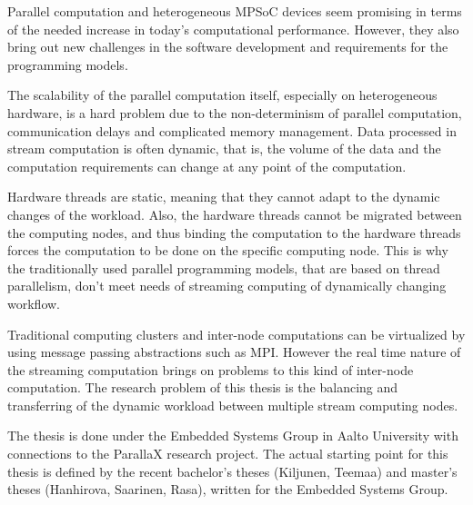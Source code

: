 Parallel computation and heterogeneous MPSoC devices seem promising in terms of the needed increase in today's computational performance. However, they also bring out new challenges in the software development and requirements for the programming models.

The scalability of the parallel computation itself, especially on heterogeneous hardware, is a hard problem due to the non-determinism of parallel computation, communication delays and complicated memory management. Data processed in stream computation is often dynamic, that is, the volume of the data and the computation requirements can change at any point of the computation.

Hardware threads are static, meaning that they cannot adapt to the dynamic changes of the workload. Also, the hardware threads cannot be migrated between the computing nodes, and thus binding the computation to the hardware threads forces the computation to be done on the specific computing node. This is why the traditionally used parallel programming models, that are based on thread parallelism, don't meet needs of streaming computing of dynamically changing workflow.

Traditional computing clusters and inter-node computations can be virtualized by using message passing abstractions such as MPI. However the real time nature of the streaming computation brings on problems to this kind of inter-node computation. The research problem of this thesis is the balancing and transferring of the dynamic workload between multiple stream computing nodes.

The thesis is done under the Embedded Systems Group in Aalto University with connections to the ParallaX research project. The actual starting point for this thesis is defined by the recent bachelor's theses (Kiljunen, Teemaa) and master's theses (Hanhirova, Saarinen, Rasa), written for the Embedded Systems Group.

